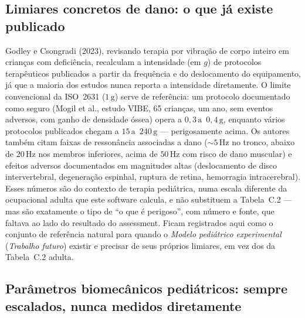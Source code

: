 \documentclass[11pt,a4paper]{article}
\newcommand{\unit}[2]{\ensuremath{#1\,\mathrm{#2}}}
\begin{document}
\subsection{Limiares concretos de dano: o que já existe publicado}

Godley e Csongradi (2023), revisando terapia por vibração de corpo inteiro em
crianças com deficiência, recalculam a intensidade (em $g$) de protocolos
terapêuticos publicados a partir da frequência e do deslocamento do
equipamento, já que a maioria dos estudos nunca reporta a intensidade
diretamente. O limite convencional da ISO~2631 (\unit{1}{g}) serve de
referência: um protocolo documentado como seguro (Mogil et al., estudo VIBE,
65 crianças, um ano, sem eventos adversos, com ganho de densidade óssea) opera
a \unit{0{,}3}{a}~\unit{0{,}4}{g}, enquanto vários protocolos publicados
chegam a \unit{15}{a}~\unit{240}{g} --- perigosamente acima. Os autores também
citam faixas de ressonância associadas a dano (\unit{\sim 5}{Hz} no tronco,
abaixo de \unit{20}{Hz} nos membros inferiores, acima de \unit{50}{Hz} com
risco de dano muscular) e efeitos adversos documentados em magnitudes altas
(deslocamento de disco intervertebral, degeneração espinhal, ruptura de
retina, hemorragia intracerebral). Esses números são do contexto de terapia
pediátrica, numa escala diferente da ocupacional adulta que este software
calcula, e não substituem a Tabela~C.2 --- mas são exatamente o tipo de
``o que é perigoso'', com número e fonte, que faltava ao lado do resultado do
assessment. Ficam registrados aqui como o conjunto de referência natural para
quando o \emph{Modelo pediátrico experimental} (\emph{Trabalho futuro}) existir
e precisar de seus próprios limiares, em vez dos da Tabela~C.2 adulta.

\subsection{Parâmetros biomecânicos pediátricos: sempre escalados, nunca medidos diretamente}
\end{document}

